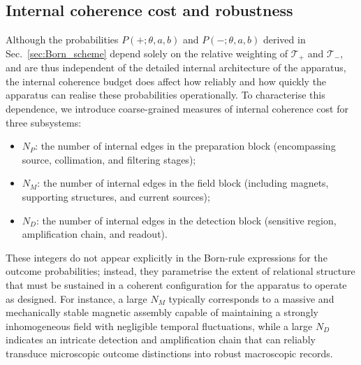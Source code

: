 \documentclass[11pt,a4paper]{article}
\numberwithin{equation}{section}
\begin{document}
\subsection{Internal coherence cost and robustness}
\label{subsec:internal_cost}

Although the probabilities $P(+;\theta,a,b)$ and $P(-;\theta,a,b)$ derived in Sec.~\ref{sec:Born_scheme} depend solely on the relative weighting of $\mathcal{T}_+$ and $\mathcal{T}_-$, and are thus independent of the detailed internal architecture of the apparatus, the internal coherence budget does affect how reliably and how quickly the apparatus can realise these probabilities operationally. To characterise this dependence, we introduce coarse-grained measures of internal coherence cost for three subsystems:
\begin{itemize}
  \item $N_P$: the number of internal edges in the preparation block (encompassing source, collimation, and filtering stages);
  \item $N_M$: the number of internal edges in the field block (including magnets, supporting structures, and current sources);
  \item $N_D$: the number of internal edges in the detection block (sensitive region, amplification chain, and readout).
\end{itemize}
These integers do not appear explicitly in the Born-rule expressions for the outcome probabilities; instead, they parametrise the extent of relational structure that must be sustained in a coherent configuration for the apparatus to operate as designed. For instance, a large $N_M$ typically corresponds to a massive and mechanically stable magnetic assembly capable of maintaining a strongly inhomogeneous field with negligible temporal fluctuations, while a large $N_D$ indicates an intricate detection and amplification chain that can reliably transduce microscopic outcome distinctions into robust macroscopic records.
\end{document}
